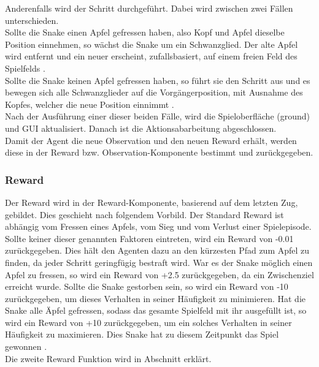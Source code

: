 Anderenfalls wird der Schritt durchgeführt. Dabei wird zwischen zwei Fällen unterschieden.\\
Sollte die Snake einen Apfel gefressen haben, also Kopf und Apfel dieselbe Position einnehmen, so wächst die Snake um ein Schwanzglied. Der alte Apfel wird entfernt und ein neuer erscheint, zufallsbasiert, auf einem freien Feld des Spielfelds .\\
Sollte die Snake keinen Apfel gefressen haben, so führt sie den Schritt aus und es bewegen sich alle Schwanzglieder auf die Vorgängerposition, mit Ausnahme des Kopfes, welcher die neue Position einnimmt .\\
Nach der Ausführung einer dieser beiden Fälle, wird die Spieloberfläche (ground) und GUI aktualisiert. Danach ist die Aktionsabarbeitung abgeschlossen.\\
Damit der Agent die neue Observation und den neuen Reward erhält, werden diese in der Reward bzw. Observation-Komponente bestimmt und zurückgegeben.

\subsubsection{Reward} \label{subsubsec:Konzept_Reward}
Der Reward wird in der Reward-Komponente, basierend auf dem letzten Zug, gebildet. Dies geschieht nach folgendem Vorbild.
Der Standard Reward ist abhängig vom Fressen eines Apfels, vom Sieg und vom Verlust einer Spielepisode. Sollte keiner dieser genannten Faktoren eintreten, wird ein Reward von -0.01 zurückgegeben. Dies hält den Agenten dazu an den kürzesten Pfad zum Apfel zu finden, da jeder Schritt geringfügig bestraft wird.
War es der Snake möglich einen Apfel zu fressen, so wird ein Reward von +2.5 zurückgegeben, da ein Zwischenziel erreicht wurde.
Sollte die Snake gestorben sein, so wird ein Reward von -10 zurückgegeben, um dieses Verhalten in seiner Häufigkeit zu minimieren.
Hat die Snake alle Äpfel gefressen, sodass das gesamte Spielfeld mit ihr ausgefüllt ist, so wird ein Reward von +10 zurückgegeben, um ein solches Verhalten in seiner Häufigkeit zu maximieren. Dies Snake hat zu diesem Zeitpunkt das Spiel gewonnen .\\
Die zweite Reward Funktion wird in Abschnitt  erklärt.

